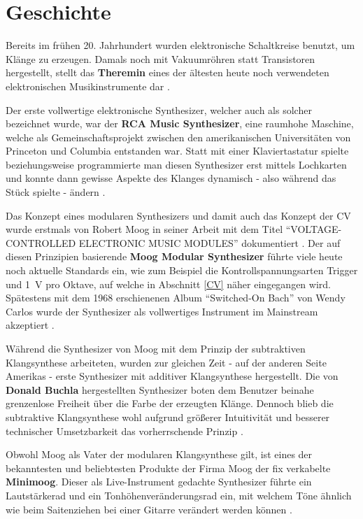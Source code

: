\section{Geschichte}
\label{sec:orgde770d3}
Bereits im frühen 20. Jahrhundert wurden elektronische Schaltkreise benutzt, um Klänge zu erzeugen. Damals noch mit Vakuumröhren statt Transistoren hergestellt, stellt das \textbf{Theremin} eines der ältesten heute noch verwendeten elektronischen Musikinstrumente dar \cite{thomann:theremin}. 

Der erste vollwertige elektronische Synthesizer, welcher auch als solcher bezeichnet wurde, war der \textbf{RCA Music Synthesizer}, eine raumhohe Maschine, welche als Gemeinschaftsprojekt zwischen den amerikanischen Universitäten von Princeton und Columbia entstanden war. Statt mit einer Klaviertastatur spielte beziehungsweise programmierte man diesen Synthesizer erst mittels Lochkarten und konnte dann gewisse Aspekte des Klanges dynamisch - also während das Stück spielte - ändern \cite{adafruit:RCA}.

\pagebreak

Das Konzept eines modularen Synthesizers und damit auch das Konzept der \acl{CV} wurde erstmals von Robert Moog in seiner Arbeit mit dem Titel "`VOLTAGE-CONTROLLED ELECTRONIC MUSIC MODULES"' dokumentiert \cite{moog1964}. Der auf diesen Prinzipien basierende \textbf{Moog Modular Synthesizer} führte viele heute noch aktuelle Standards ein, wie zum Beispiel die Kontrollspannungsarten Trigger und \SI{1}{\volt} pro Oktave, auf welche in Abschnitt \ref{CV} näher eingegangen wird. Spätestens mit dem 1968 erschienenen Album "`Switched-On Bach"' von Wendy Carlos wurde der Synthesizer als vollwertiges Instrument im Mainstream akzeptiert \cite{yamaha:history} \cite{120years:moog}. 

Während die Synthesizer von Moog mit dem Prinzip der subtraktiven Klangsynthese arbeiteten, wurden zur gleichen Zeit - auf der anderen Seite Amerikas - erste Synthesizer mit additiver Klangsynthese hergestellt. Die von \textbf{Donald Buchla} hergestellten Synthesizer boten dem Benutzer beinahe grenzenlose Freiheit über die Farbe der erzeugten Klänge. Dennoch blieb die subtraktive Klangsynthese wohl aufgrund größerer Intuitivität und besserer technischer Umsetzbarkeit das vorherrschende Prinzip \cite{120years:buchla}. 

Obwohl Moog als Vater der modularen Klangsynthese gilt, ist eines der bekanntesten und beliebtesten Produkte der Firma Moog der fix verkabelte \textbf{Minimoog}. Dieser als Live-Instrument gedachte Synthesizer führte ein Lautstärkerad und ein Tonhöhenveränderungsrad ein, mit welchem Töne ähnlich wie beim Saitenziehen bei einer Gitarre verändert werden können \cite{120years:moog}.

